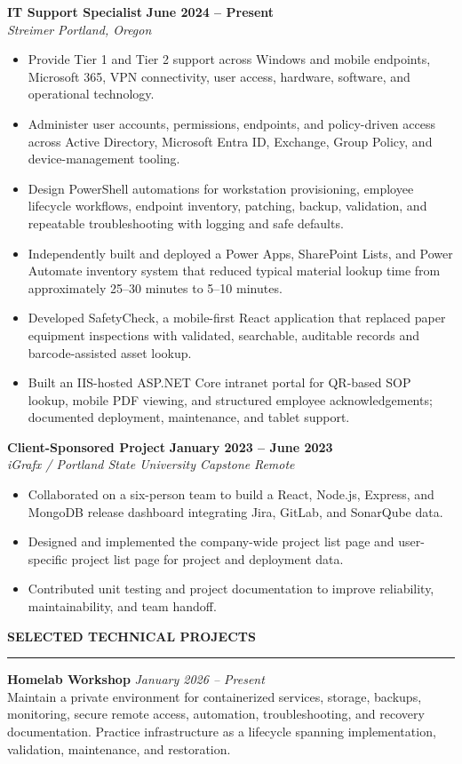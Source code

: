 \documentclass[letterpaper,10pt]{article}
\newcommand{\resumesection}[1]{%
  \vspace{6pt}
  {\large\bfseries\MakeUppercase{#1}}\par
  \vspace{2pt}
  \hrule
  \vspace{3.5pt}
}
\newcommand{\role}[4]{%
  \textbf{#1} \hfill \textbf{#2}\\
  \textit{#3} \hfill \textit{#4}\vspace{2.5pt}
}
\newcommand{\project}[3]{%
  \textbf{#1} \hfill \textit{#2}\\
  #3
}
\begin{document}
\role{IT Support Specialist}{June 2024 -- Present}{Streimer}{Portland, Oregon}
\begin{itemize}
  \item Provide Tier 1 and Tier 2 support across Windows and mobile endpoints, Microsoft 365, VPN connectivity, user access, hardware, software, and operational technology.
  \item Administer user accounts, permissions, endpoints, and policy-driven access across Active Directory, Microsoft Entra ID, Exchange, Group Policy, and device-management tooling.
  \item Design PowerShell automations for workstation provisioning, employee lifecycle workflows, endpoint inventory, patching, backup, validation, and repeatable troubleshooting with logging and safe defaults.
  \item Independently built and deployed a Power Apps, SharePoint Lists, and Power Automate inventory system that reduced typical material lookup time from approximately 25--30 minutes to 5--10 minutes.
  \item Developed SafetyCheck, a mobile-first React application that replaced paper equipment inspections with validated, searchable, auditable records and barcode-assisted asset lookup.
  \item Built an IIS-hosted ASP.NET Core intranet portal for QR-based SOP lookup, mobile PDF viewing, and structured employee acknowledgements; documented deployment, maintenance, and tablet support.
\end{itemize}

\vspace{3pt}
\role{Client-Sponsored Project}{January 2023 -- June 2023}{iGrafx / Portland State University Capstone}{Remote}
\begin{itemize}
  \item Collaborated on a six-person team to build a React, Node.js, Express, and MongoDB release dashboard integrating Jira, GitLab, and SonarQube data.
  \item Designed and implemented the company-wide project list page and user-specific project list page for project and deployment data.
  \item Contributed unit testing and project documentation to improve reliability, maintainability, and team handoff.
\end{itemize}

\resumesection{Selected Technical Projects}

\project{Homelab Workshop}{January 2026 -- Present}{%
Maintain a private environment for containerized services, storage, backups, monitoring, secure remote access, automation, troubleshooting, and recovery documentation. Practice infrastructure as a lifecycle spanning implementation, validation, maintenance, and restoration.}
\end{document}
